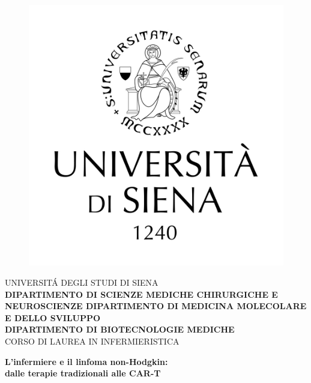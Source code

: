 \begin{titlepage}
\begin{figure}[!htb]
    \centering
    \includegraphics[keepaspectratio=true,scale=0.8]{format/img/LOGO_UNISI_VERTICALE_NERO_medio.jpg}
\end{figure}

\begin{center}
    \large{UNIVERSIT\'A DEGLI STUDI DI SIENA}
    \vspace{5mm}
    \\ \large{\bf DIPARTIMENTO DI SCIENZE MEDICHE CHIRURGICHE E NEUROSCIENZE
    DIPARTIMENTO DI MEDICINA MOLECOLARE E DELLO SVILUPPO\\
    DIPARTIMENTO DI BIOTECNOLOGIE MEDICHE}
    \vspace{0.5mm}
    \\ \large{CORSO DI LAUREA IN INFERMIERISTICA}
\end{center}

\vspace{15mm}
\begin{center}
    {\LARGE{\bf L'infermiere e il linfoma non-Hodgkin:\\ \vspace{5mm} dalle terapie tradizionali alle CAR-T }}
    
    

\end{center}
\end{titlepage}
